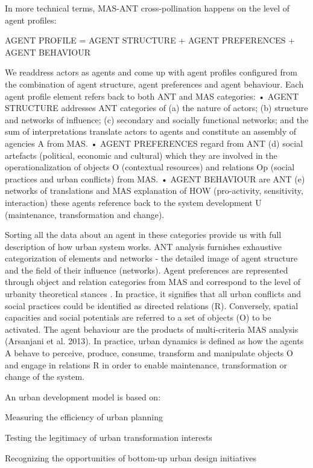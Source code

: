 \documentclass[11pt]{report}
\begin{document}
In more technical terms, MAS-ANT cross-pollination happens on the level of agent profiles:

AGENT PROFILE = AGENT STRUCTURE + AGENT PREFERENCES + AGENT BEHAVIOUR

We readdress actors as agents and come up with agent profiles configured from the combination of agent structure, agent preferences and agent behaviour. Each agent profile element refers back to both ANT and MAS categories:
•	AGENT STRUCTURE addresses ANT categories of (a) the nature of actors; (b) structure and networks of influence; (c) secondary and socially functional networks; and the sum of interpretations translate actors to agents and constitute an assembly of agencies A from MAS. 
•	AGENT PREFERENCES regard from ANT (d) social artefacts (political, economic and cultural) which they are involved in the operationalization of objects O (contextual resources) and relations Op (social practices and urban conflicts) from MAS.
•	AGENT BEHAVIOUR are ANT (e) networks of translations and MAS explanation of HOW (pro-activity, sensitivity, interaction) these agents reference back to the system development U (maintenance, transformation and change).

Sorting all the data about an agent in these categories provide us with full description of how urban system works. ANT analysis furnishes exhaustive categorization of elements and networks - the detailed image of agent structure and the field of their influence (networks). Agent preferences are represented through object and relation categories from MAS and correspond to the level of urbanity theoretical stances . In practice, it signifies that all urban conflicts and social practices could be identified as directed relations (R). Conversely, spatial capacities and social potentials are referred to a set of objects (O) to be activated. The agent behaviour are the products of multi-criteria MAS analysis (Arsanjani et al. 2013). In practice, urban dynamics is defined as how the agents A behave to perceive, produce, consume, transform and manipulate objects O and engage in relations R in order to enable maintenance, transformation or change of the system.

An urban development model is based on:

Measuring the efficiency of urban planning

Testing the legitimacy of urban transformation interests

Recognizing the opportunities of bottom-up urban design initiatives
\end{document}
